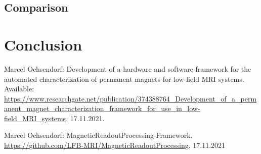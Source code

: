 \documentclass[conference]{IEEEtran}
\begin{document}
\subsection{Comparison}


\section{Conclusion}


\begingroup
\begin{thebibliography}{00}
 Marcel Ochsendorf: Development of a hardware and software framework for the automated characterization of permanent magnets for low-field MRI systems. Available: \url{https://www.researchgate.net/publication/374388764_Development_of_a_permanent_magnet_characterization_framework_for_use_in_low-field_MRI_systems}, 17.11.2021.

\vskip 0.05in
 Marcel Ochsendorf: MagneticReadoutProcessing-Framework. \url{https://github.com/LFB-MRI/MagneticReadoutProcessing}, 17.11.2021


\end{thebibliography}
\endgroup
\end{document}
